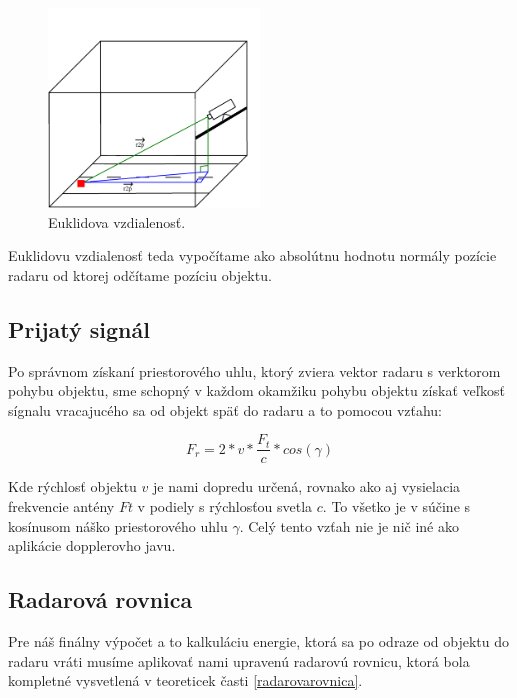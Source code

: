     \begin{figure}[h]
        \centering
        \includegraphics[width=0.5\textwidth]{obrazky-figures/euclid.png}
        \caption{Euklidova vzdialenosť.}
        \label{fig:euclid}
    \end{figure}      

    Euklidovu vzdialenosť teda vypočítame ako absolútnu hodnotu normály pozície radaru od ktorej odčítame pozíciu objektu.


    \subsection{Prijatý signál}

    \hspace{0.6cm}Po správnom získaní priestorového uhlu, ktorý zviera vektor radaru s verktorom pohybu objektu, sme schopný v každom okamžiku pohybu objektu získať veľkosť sígnalu vracajucého sa od objekt späť do radaru a to pomocou vzťahu:

      \begin{equation} %
        F_{r} = 2 * v * \frac{F_{t}}{c} * cos(\gamma)
      \end{equation}   

    Kde rýchlosť objektu $v$ je nami dopredu určená, rovnako ako aj vysielacia frekvencie antény $Ft$ v podiely s rýchlosťou svetla $c$. To všetko je v súčine s kosínusom náško priestorového uhlu $\gamma$.
    Celý tento vzťah nie je nič iné ako aplikácie dopplerovho javu.

    \subsection{Radarová rovnica}

    \hspace{0.6cm}Pre náš finálny výpočet a to kalkuláciu energie, ktorá sa po odraze od objektu do radaru vráti musíme aplikovať nami upravenú radarovú rovnicu, ktorá bola  kompletné vysvetlená v teoreticek časti \ref{radarovarovnica}.

